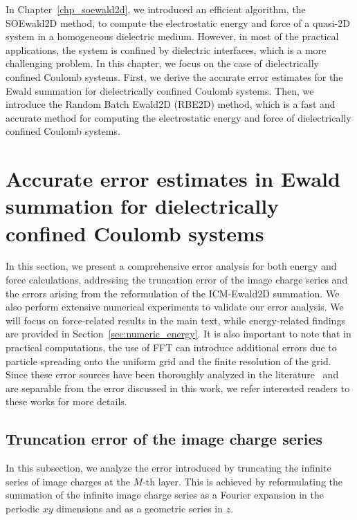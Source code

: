 In Chapter~\ref{chp_soewald2d}, we introduced an efficient algorithm, the SOEwald2D method, to compute the electrostatic energy and force of a quasi-2D system in a homogeneous dielectric medium.
However, in most of the practical applications, the system is confined by dielectric interfaces, which is a more challenging problem.
In this chapter, we focus on the case of dielectrically confined Coulomb systems.
First, we derive the accurate error estimates for the Ewald summation for dielectrically confined Coulomb systems.
Then, we introduce the Random Batch Ewald2D (RBE2D) method, which is a fast and accurate method for computing the electrostatic energy and force of dielectrically confined Coulomb systems.


\section{Accurate error estimates in Ewald summation for dielectrically confined Coulomb systems}

In this section, we present a comprehensive error analysis for both energy and force calculations, addressing the truncation error of the image charge series and the errors arising from the reformulation of the ICM-Ewald2D summation. 
We also perform extensive numerical experiments to validate our error analysis.
We will focus on force-related results in the main text, while energy-related findings are provided in Section~\ref{sec:numeric_energy}.
It is also important to note that in practical computations, the use of FFT can introduce additional errors due to particle spreading onto the uniform grid and the finite resolution of the grid. 
Since these error sources have been thoroughly analyzed in the literature~\cite{deserno1998mesh,wang2012numerical,liang2023error,wang2016multiple,barnett2019parallel,barnett2021aliasing} and are separable from the error discussed in this work, we refer interested readers to these works for more details.

\subsection{Truncation error of the image charge series}\label{sec:error_image}

In this subsection, we analyze the error introduced by truncating the infinite series of image charges at the $M$-th layer. 
This is achieved by reformulating the summation of the infinite image charge series as a Fourier expansion in the periodic $xy$ dimensions and as a geometric series in $z$. 

